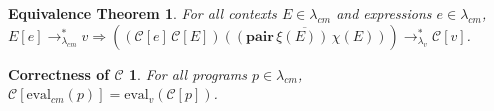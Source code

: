 \documentclass[ms,electronic,twosidetoc,letterpaper,chaptercenter,parttop]{byumsphd}
\begin{document}






\newtheorem*{eqtheorem}{Equivalence Theorem}
\begin{eqtheorem}
For all contexts $E\in\lambda_{cm}$ and expressions $e\in\lambda_{cm}$, $E[e]\rightarrow_{\lambda_{cm}}^{*}v\Rightarrow ((\mathcal{C}[e]\,\mathcal{C}[E]) \overline{((\mathbf{pair}\,\xi(E))\,\chi(E))})\rightarrow_{\lambda_v}^{*}\mathcal{C}[v]$.
\end{eqtheorem}



\newtheorem*{maintheorem}{Correctness of $\mathcal{C}$}
\begin{maintheorem}
For all programs $p\in\lambda_{cm}$, $\mathcal{C}[\mathrm{eval}_{cm}(p)]=\mathrm{eval}_{v}(\mathcal{C}[p])$.
\end{maintheorem}
\end{document}
